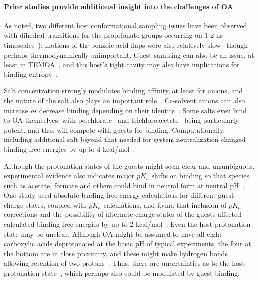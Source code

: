 \documentclass[aps,pre,twocolumn,nofootinbib,superscriptaddress,10pt, final,tightenlines]{revtex4-1}
\begin{document}
\paragraph{Prior studies provide additional insight into the challenges of OA}

As noted, two different host conformational sampling issues have been observed, with dihedral transitions for the proprionate groups occurring on 1-2 ns timescales~\cite{mikulskis_free-energy_2014}); motions of the benzoic acid flaps were also relatively slow~\cite{yin_sampl5_2016, tofoleanu_absolute_2016} though perhaps thermodynamically unimportant. 
Guest sampling can also be an issue, at least in TEMOA~\cite{yin_overview_2016}, and this host's tight cavity may also have implications for binding entropy~\cite{yin_sampl5_2016}.

Salt concentration strongly modulates binding affinity, at least for anions, and the nature of the salt also plays an important role~\cite{carnegie_anion_2014}. 
Co-solvent anions can also increase \emph{or} decrease binding depending on their identity~\cite{gibb_anion_2011}. 
Some salts even bind to OA themselves, with perchlorate~\cite{gibb_anion_2011} and trichloroacetate~\cite{sokkalingam_binding_2016} being particularly potent, and thus will compete with guests for binding.  
Computationally, including additional salt beyond that needed for system neutralization changed binding free energies by up to 4 kcal/mol~\cite{tofoleanu_absolute_2016}.  

Although the protonation states of the guests might seem clear and unambiguous, experimental evidence also indicates major $pK_a$ shifts on binding so that species such as acetate, formate and others could bind in neutral form at neutral pH~\cite{wang_itc_2016, sokkalingam_binding_2016}. 
One study used absolute binding free energy calculations for different guest charge states, coupled with $pK_a$ calculations, and found that inclusion of $pK_a$ corrections and the possibility of alternate charge states of the guests affected calculated binding free energies by up to 2 kcal/mol~\cite{tofoleanu_absolute_2016}.
Even the host protonation state may be unclear. Although OA might be assumed to have all eight carboxylic acids deprotonated at the basic pH of typical experiments, the four at the bottom are in close proximity, and these might make hydrogen bonds allowing retention of two protons~\cite{ewell_water_2008}.  
Thus, there are uncertainties as to the host protonation state~\cite{muddana_sampl4_2014, ewell_water_2008}, which perhaps also could be modulated by guest binding.  
\end{document}

